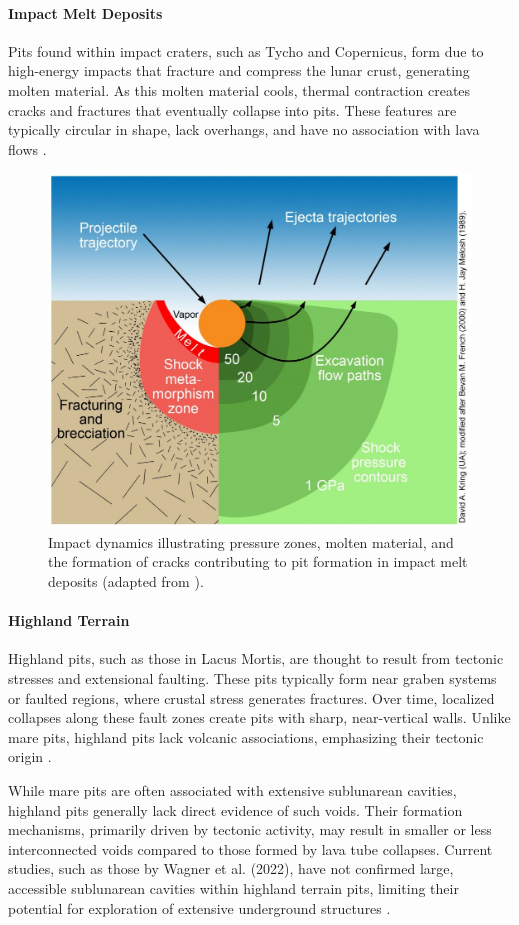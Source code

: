\paragraph{Impact Melt Deposits}
Pits found within impact craters, such as Tycho and Copernicus, form due to high-energy impacts that fracture and compress the lunar crust, generating molten material. As this molten material cools, thermal contraction creates cracks and fractures that eventually collapse into pits. These features are typically circular in shape, lack overhangs, and have no association with lava flows \cite{clrn-impact-melt, lunar-pits-numerical-modelling}.

\begin{figure}[H]
    \centering
    \includegraphics[width=0.42\linewidth]{Impact-Shock-Pressures-and-Their-Effects-1024x857.jpg}
    \caption{Impact dynamics illustrating pressure zones, molten material, and the formation of cracks contributing to pit formation in impact melt deposits (adapted from \cite{clrn-impact-melt}).}
    \label{fig:impact-melt}
\end{figure}

\paragraph{Highland Terrain}
Highland pits, such as those in Lacus Mortis, are thought to result from tectonic stresses and extensional faulting. These pits typically form near graben systems or faulted regions, where crustal stress generates fractures. Over time, localized collapses along these fault zones create pits with sharp, near-vertical walls. Unlike mare pits, highland pits lack volcanic associations, emphasizing their tectonic origin \cite{new-wagner, lunar-pit-distribution}. 

While mare pits are often associated with extensive sublunarean cavities, highland pits generally lack direct evidence of such voids. Their formation mechanisms, primarily driven by tectonic activity, may result in smaller or less interconnected voids compared to those formed by lava tube collapses. Current studies, such as those by Wagner et al. (2022), have not confirmed large, accessible sublunarean cavities within highland terrain pits, limiting their potential for exploration of extensive underground structures \cite{lunar-pit-distribution, radar-observations-lava-tubes, cavities-selene-lavatubes}.

